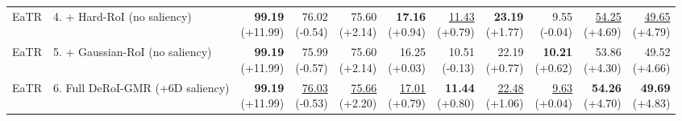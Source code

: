 \documentclass{article}
\begin{document}
{\begin{tabular}{llrrrrrrrrr}
EaTR & 4. + Hard-RoI (no saliency) & \shortstack{\textbf{99.19} \\ {\scriptsize (+11.99)}} & \shortstack{76.02 \\ {\scriptsize (-0.54)}} & \shortstack{75.60 \\ {\scriptsize (+2.14)}} & \shortstack{\textbf{17.16} \\ {\scriptsize (+0.94)}} & \shortstack{\underline{11.43} \\ {\scriptsize (+0.79)}} & \shortstack{\textbf{23.19} \\ {\scriptsize (+1.77)}} & \shortstack{9.55 \\ {\scriptsize (-0.04)}} & \shortstack{\underline{54.25} \\ {\scriptsize (+4.69)}} & \shortstack{\underline{49.65} \\ {\scriptsize (+4.79)}} \\
EaTR & 5. + Gaussian-RoI (no saliency) & \shortstack{\textbf{99.19} \\ {\scriptsize (+11.99)}} & \shortstack{75.99 \\ {\scriptsize (-0.57)}} & \shortstack{75.60 \\ {\scriptsize (+2.14)}} & \shortstack{16.25 \\ {\scriptsize (+0.03)}} & \shortstack{10.51 \\ {\scriptsize (-0.13)}} & \shortstack{22.19 \\ {\scriptsize (+0.77)}} & \shortstack{\textbf{10.21} \\ {\scriptsize (+0.62)}} & \shortstack{53.86 \\ {\scriptsize (+4.30)}} & \shortstack{49.52 \\ {\scriptsize (+4.66)}} \\
EaTR & 6. Full DeRoI-GMR (+6D saliency) & \shortstack{\textbf{99.19} \\ {\scriptsize (+11.99)}} & \shortstack{\underline{76.03} \\ {\scriptsize (-0.53)}} & \shortstack{\underline{75.66} \\ {\scriptsize (+2.20)}} & \shortstack{\underline{17.01} \\ {\scriptsize (+0.79)}} & \shortstack{\textbf{11.44} \\ {\scriptsize (+0.80)}} & \shortstack{\underline{22.48} \\ {\scriptsize (+1.06)}} & \shortstack{\underline{9.63} \\ {\scriptsize (+0.04)}} & \shortstack{\textbf{54.26} \\ {\scriptsize (+4.70)}} & \shortstack{\textbf{49.69} \\ {\scriptsize (+4.83)}} \\

\end{tabular}}
\end{document}

